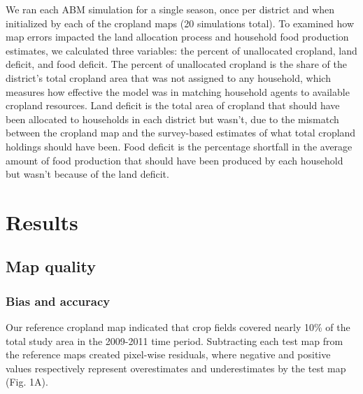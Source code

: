\documentclass[a4paper]{article}
\begin{document}
We ran each ABM simulation for a single season, once per district and when initialized by each of the cropland maps (20 simulations total). 
To examined how map errors impacted the land allocation process and household food production estimates, we calculated three variables: the percent of unallocated cropland, land deficit, and food deficit. The percent of unallocated cropland is the share of the district's total cropland area that was not assigned to any household, which measures how effective the model was in matching household agents to available cropland resources. Land deficit is the total area of cropland that should have been allocated to households in each district but wasn't, due to the mismatch between the cropland map and the survey-based estimates of what total cropland holdings should have been. Food deficit is the percentage shortfall in the average amount of food production that should have been produced by each household but wasn't because of the land deficit. 

\vspace{-0.5 cm}
\section*{Results}
\subsection*{Map quality}
\subsubsection*{Bias and accuracy}
Our reference cropland map indicated that crop fields covered nearly 10\% of the total study area in the 2009-2011 time period. Subtracting each test map from the reference maps created pixel-wise residuals, where negative and positive values respectively represent overestimates and underestimates by the test map (Fig. 1A).    
\end{document}
